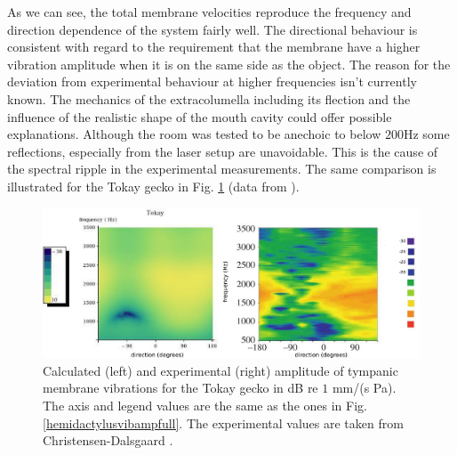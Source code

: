 As we can see, the total membrane velocities reproduce the frequency and direction dependence of the system fairly well. The directional behaviour is consistent with regard
to the requirement that the membrane have a higher vibration amplitude when it is on the same side as the object. The reason for the deviation from experimental behaviour at 
higher frequencies isn't currently known. The mechanics of the extracolumella including its flection and the influence of the realistic shape of the mouth cavity could offer possible explanations.
Although the room was tested to be anechoic to below $200$Hz some reflections, especially from
the laser setup are unavoidable. This is the cause of the spectral ripple in the experimental measurements. The same comparison is illustrated for the Tokay gecko in Fig. \ref{tokayvibampfull} (data from \cite{dalsgaardmanley1}).
\begin{figure}[ht!]
 \centering
 \includegraphics[width=1.0\linewidth]{Diagrams/Plots/tokayvibampfull.png}
 \caption[Vibration amplitude for the Tokay gecko]{Calculated (left) and experimental (right) amplitude of tympanic membrane vibrations for the Tokay gecko
 in dB re $1$ mm/(s Pa). The axis and legend values are the same as the ones in Fig. \ref{hemidactylusvibampfull}. The experimental values are taken from Christensen-Dalsgaard \cite{dalsgaardmanley1}.}
  \label{tokayvibampfull}
\end{figure}

